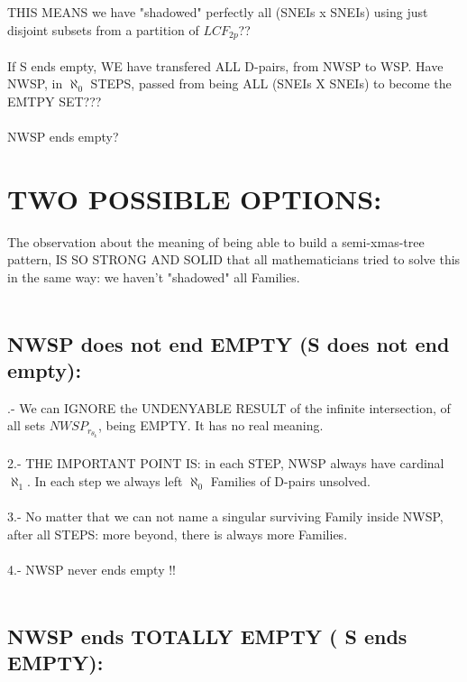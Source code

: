 		\noindent
		THIS MEANS we have "shadowed" perfectly all (SNEIs x SNEIs) using just disjoint subsets from a partition of $LCF_{2p}$??
		\\\\
		
		\noindent
		If S ends empty, WE have transfered ALL D-pairs, from NWSP to WSP. Have NWSP, in $\aleph_{0}$ STEPS, passed from being ALL (SNEIs X SNEIs) to become the EMTPY SET???
		\\\\
		
		\noindent
		NWSP ends empty?
	
	\newpage
	\section{TWO POSSIBLE OPTIONS:}
	
	
		\noindent
		The observation about the meaning of being able to build a semi-xmas-tree pattern, IS SO STRONG AND SOLID that all mathematicians tried to solve this in the same way: we haven't "shadowed" all Families.
		\\\\
		
		
		\subsection {NWSP does not end EMPTY (S does not end empty):}
			
			.- We can IGNORE the UNDENYABLE RESULT of the infinite intersection, of all sets $NWSP_{r_{\theta_{k}}}$, being EMPTY. It has no real meaning.\\\\
			2.- THE IMPORTANT POINT IS: in each STEP, NWSP always have cardinal $\aleph_{1}$. In each step we always left $\aleph_{0}$ Families of D-pairs unsolved.\\\\
			3.- No matter that we can not name a singular surviving Family inside NWSP, after all STEPS: more beyond, there is always more Families.\\\\
			4.- NWSP never ends empty !!
			\\\\
		
		\subsection{NWSP ends TOTALLY EMPTY ( S ends EMPTY):}
		
